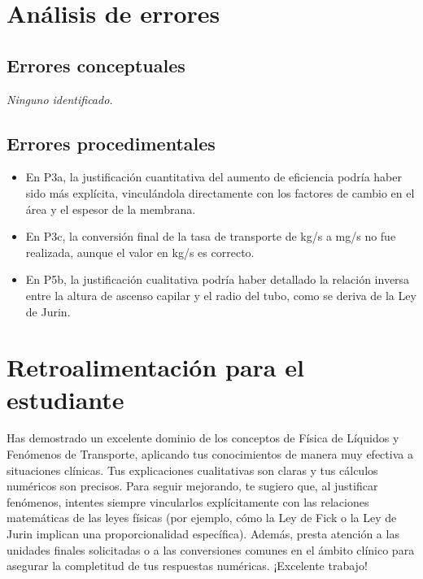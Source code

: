 \documentclass[11pt,a4paper]{article}
\begin{document}
\section*{Análisis de errores}

\subsection*{Errores conceptuales}
\textit{Ninguno identificado.}

\subsection*{Errores procedimentales}
\begin{itemize}[leftmargin=1.5em, itemsep=2pt]
  \item En P3a, la justificación cuantitativa del aumento de eficiencia podría haber sido más explícita, vinculándola directamente con los factores de cambio en el área y el espesor de la membrana.
  \item En P3c, la conversión final de la tasa de transporte de kg/s a mg/s no fue realizada, aunque el valor en kg/s es correcto.
  \item En P5b, la justificación cualitativa podría haber detallado la relación inversa entre la altura de ascenso capilar y el radio del tubo, como se deriva de la Ley de Jurin.
\end{itemize}

\section*{Retroalimentación para el estudiante}
\begin{tcolorbox}[cajaRecomendacion, title={Dirigido a: Maria Fernanda Goicetto}]
Has demostrado un excelente dominio de los conceptos de Física de Líquidos y Fenómenos de Transporte, aplicando tus conocimientos de manera muy efectiva a situaciones clínicas. Tus explicaciones cualitativas son claras y tus cálculos numéricos son precisos. Para seguir mejorando, te sugiero que, al justificar fenómenos, intentes siempre vincularlos explícitamente con las relaciones matemáticas de las leyes físicas (por ejemplo, cómo la Ley de Fick o la Ley de Jurin implican una proporcionalidad específica). Además, presta atención a las unidades finales solicitadas o a las conversiones comunes en el ámbito clínico para asegurar la completitud de tus respuestas numéricas. ¡Excelente trabajo!
\end{tcolorbox}
\end{document}
